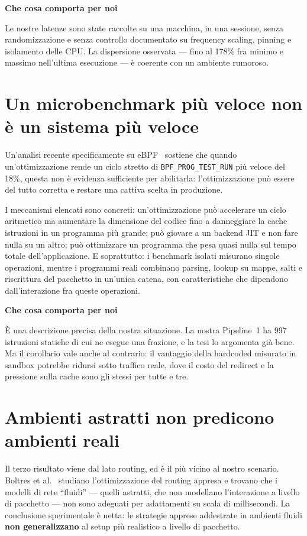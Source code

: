 \documentclass[11pt,a4paper,oneside]{report}
\newcommand{\verdetto}[2]{%
  \par\vspace{4pt}%
  \noindent\colorbox{boxbg}{%
    \begin{minipage}{\dimexpr\linewidth-2\fboxsep}%
      \vspace{3pt}\textbf{\color{accent}#1}\par\vspace{2pt}#2\vspace{3pt}%
    \end{minipage}}%
  \par\vspace{6pt}}
\begin{document}
\verdetto{Che cosa comporta per noi}{Le nostre latenze sono state
raccolte su una macchina, in una sessione, senza randomizzazione e
senza controllo documentato su frequency scaling, pinning e
isolamento delle CPU. La dispersione osservata --- fino al 178\% fra
minimo e massimo nell'ultima esecuzione --- è coerente con un ambiente
rumoroso.}

\section{Un microbenchmark più veloce non è un sistema più veloce}

Un'analisi recente specificamente su eBPF~\cite{eunomia} sostiene che
quando un'ottimizzazione rende un ciclo stretto di
\texttt{BPF\_PROG\_TEST\_RUN} più veloce del 18\%, questa non è
evidenza sufficiente per abilitarla: l'ottimizzazione può essere del
tutto corretta e restare una cattiva scelta in produzione.

I meccanismi elencati sono concreti: un'ottimizzazione può accelerare
un ciclo aritmetico ma aumentare la dimensione del codice fino a
danneggiare la cache istruzioni in un programma più grande; può
giovare a un backend JIT e non fare nulla su un altro; può ottimizzare
un programma che pesa quasi nulla sul tempo totale dell'applicazione.
E soprattutto: i benchmark isolati misurano singole operazioni, mentre
i programmi reali combinano parsing, lookup su mappe, salti e
riscrittura del pacchetto in un'unica catena, con caratteristiche che
dipendono dall'interazione fra queste operazioni.

\verdetto{Che cosa comporta per noi}{È una descrizione precisa della
nostra situazione. La nostra Pipeline~1 ha 997 istruzioni statiche di
cui ne esegue una frazione, e la tesi lo argomenta già bene. Ma il
corollario vale anche al contrario: il vantaggio della hardcoded
misurato in sandbox potrebbe ridursi sotto traffico reale, dove il
costo del redirect e la pressione sulla cache sono gli stessi per
tutte e tre.}

\section{Ambienti astratti non predicono ambienti reali}

Il terzo risultato viene dal lato routing, ed è il più vicino al
nostro scenario. Boltres et al.~\cite{boltres24} studiano
l'ottimizzazione del routing appresa e trovano che i modelli di rete
``fluidi'' --- quelli astratti, che non modellano l'interazione a
livello di pacchetto --- non sono adeguati per adattamenti su scala di
millisecondi. La conclusione sperimentale è netta: le strategie
apprese addestrate in ambienti fluidi \textbf{non generalizzano} al
setup più realistico a livello di pacchetto.
\end{document}
